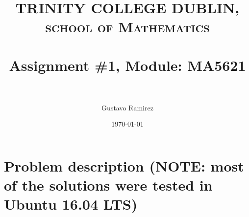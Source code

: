 \documentclass[paper=a4, fontsize=11pt]{scrartcl} %
\title{	
\normalfont \normalsize 
\textsc{TRINITY COLLEGE DUBLIN, school of Mathematics} \\ [25pt] %
\horrule{0.5pt} \\[0.4cm] %
\huge Assignment \#1, Module: MA5621 \\ %
\horrule{2pt} \\[0.5cm] %
}
\author{Gustavo Ramirez} %
\date{\normalsize\today} %
\numberwithin{equation}{section} %
\numberwithin{figure}{section} %
\numberwithin{table}{section} %
\begin{document}


\maketitle %




\section{Problem description (NOTE: most of the solutions were tested in Ubuntu 16.04 LTS)}
\end{document}

